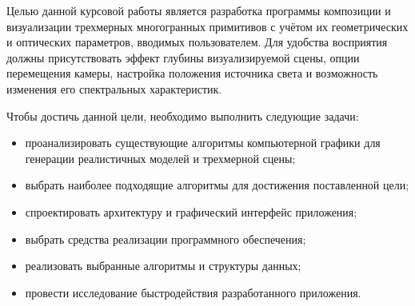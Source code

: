 
Целью данной курсовой работы является разработка программы композиции и визуализации трехмерных многогранных примитивов с учётом их геометрических и оптических параметров, вводимых пользователем. Для удобства восприятия должны присутствовать эффект глубины визуализируемой сцены, опции перемещения камеры, настройка положения источника света и возможность изменения его спектральных характеристик.

Чтобы достичь данной цели, необходимо выполнить следующие задачи:
\begin{itemize}
	\item проанализировать существующие алгоритмы компьютерной графики для генерации реалистичных моделей и трехмерной сцены;
	\item выбрать наиболее подходящие алгоритмы для достижения поставленной цели;
	\item спроектировать архитектуру и графический интерфейс приложения;
	\item выбрать средства реализации программного обеспечения;
	\item реализовать выбранные алгоритмы и структуры данных;
	\item провести исследование быстродействия разработанного приложения.
\end{itemize}

\clearpage
